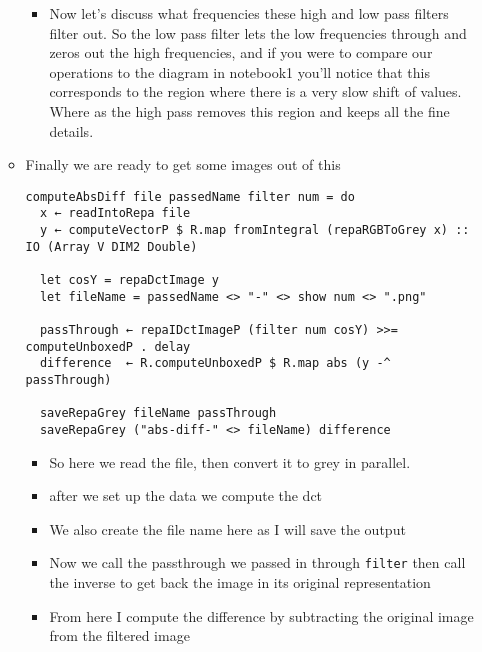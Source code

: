 \documentclass{article}
\begin{document}
\begin{enumerate}
\begin{itemize}
\begin{itemize}
\item Now let's discuss what frequencies these high and low pass filters
filter out. So the low pass filter lets the low frequencies
through and zeros out the high frequencies, and if you were to compare
our operations to the diagram in notebook1 you'll notice that this
corresponds to the region where there is a very slow shift of
values. Where as the high pass removes this region and keeps all the
fine details.
\end{itemize}

\item Finally we are ready to get some images out of this
\begin{verbatim}
computeAbsDiff file passedName filter num = do
  x ← readIntoRepa file
  y ← computeVectorP $ R.map fromIntegral (repaRGBToGrey x) :: IO (Array V DIM2 Double)

  let cosY = repaDctImage y
  let fileName = passedName <> "-" <> show num <> ".png"

  passThrough ← repaIDctImageP (filter num cosY) >>= computeUnboxedP . delay
  difference  ← R.computeUnboxedP $ R.map abs (y -^ passThrough)

  saveRepaGrey fileName passThrough
  saveRepaGrey ("abs-diff-" <> fileName) difference
\end{verbatim}
\begin{itemize}
\item So here we read the file, then convert it to grey in
parallel.
\item after we set up the data we compute the dct

\item We also create the file name here as Ι will save the output

\item Now we call the passthrough we passed in through \texttt{filter} then
call the inverse to get back the image in its original representation

\item From here I compute the difference by subtracting the original
image from the filtered image


\end{itemize}
\end{itemize}
\end{enumerate}
\end{document}
